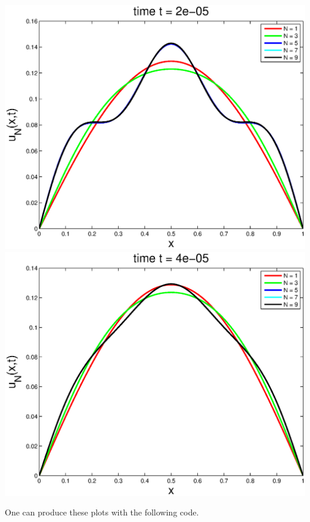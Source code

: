 \begin{solution}
\begin{enumerate}
\begin{center}
\includegraphics[scale=0.4]{fourth_c}
\includegraphics[scale=0.4]{fourth_d}
\end{center}

One can produce these plots with the following code.



\end{enumerate}
\end{solution}